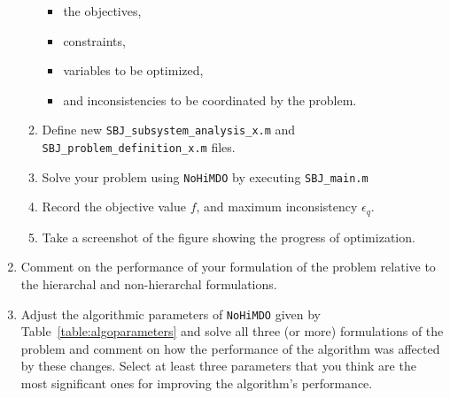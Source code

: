 \documentclass[11pt]{article}
\begin{document}
\begin{enumerate}
\begin{enumerate}
    \begin{itemize}
      \item the objectives,
      \item constraints,
      \item variables to be optimized,
      \item and inconsistencies to be coordinated by the problem.
    \end{itemize}
    \item Define new \texttt{SBJ\_subsystem\_analysis\_x.m} and \texttt{SBJ\_problem\_definition\_x.m} files.
    \item Solve your problem using \texttt{NoHiMDO} by executing \texttt{SBJ\_main.m}
    \item Record the objective value $f$, and maximum inconsistency $\epsilon_q$.
    \item Take a screenshot of the figure showing the progress of optimization.
  \end{enumerate}
  \item Comment on the performance of your formulation of the problem relative to the hierarchal and non-hierarchal formulations.
  \item Adjust the algorithmic parameters of \texttt{NoHiMDO} given by Table~\ref{table:algoparameters} and solve all three (or more) formulations of the problem and comment on how the performance of the algorithm was affected by these changes. Select at least three parameters that you think are the most significant ones for improving the algorithm's performance.
\end{enumerate}



\end{document}
